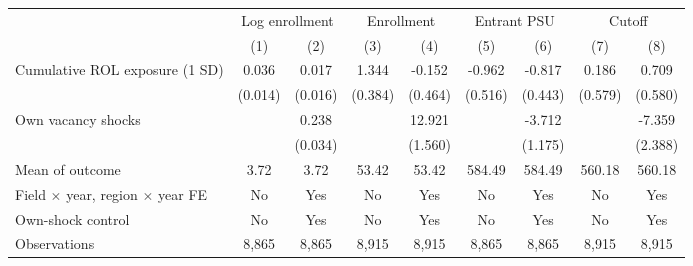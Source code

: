 \begin{tabular}{l*{8}{c}}
\toprule
 & \multicolumn{2}{c}{Log enrollment} & \multicolumn{2}{c}{Enrollment}
 & \multicolumn{2}{c}{Entrant PSU} & \multicolumn{2}{c}{Cutoff} \\
\cmidrule(lr){2-3}\cmidrule(lr){4-5}\cmidrule(lr){6-7}\cmidrule(lr){8-9}
 & (1) & (2) & (3) & (4) & (5) & (6) & (7) & (8) \\
\midrule
Cumulative ROL exposure (1 SD)&       0.036\sym{**} &       0.017         &       1.344\sym{***}&      -0.152         &      -0.962\sym{*}  &      -0.817\sym{*}  &       0.186         &       0.709         \\
            &     (0.014)         &     (0.016)         &     (0.384)         &     (0.464)         &     (0.516)         &     (0.443)         &     (0.579)         &     (0.580)         \\
\addlinespace
Own vacancy shocks&                     &       0.238\sym{***}&                     &      12.921\sym{***}&                     &      -3.712\sym{***}&                     &      -7.359\sym{***}\\
            &                     &     (0.034)         &                     &     (1.560)         &                     &     (1.175)         &                     &     (2.388)         \\
\midrule
Mean of outcome&        3.72         &        3.72         &       53.42         &       53.42         &      584.49         &      584.49         &      560.18         &      560.18         \\
Field \(\times\) year, region \(\times\) year FE&          No         &         Yes         &          No         &         Yes         &          No         &         Yes         &          No         &         Yes         \\
Own-shock control&          No         &         Yes         &          No         &         Yes         &          No         &         Yes         &          No         &         Yes         \\
Observations&       8,865         &       8,865         &       8,915         &       8,915         &       8,865         &       8,865         &       8,915         &       8,915         \\
\bottomrule
\end{tabular}
